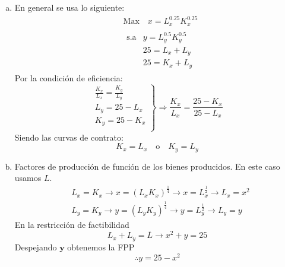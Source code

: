 \begin{enumerate}[a)]
	\item En general se usa lo siguiente:
			\begin{align*}
				& \text{Max} \quad x = L_{x}^{0.25}K_{x}^{0.25}\\
				& \begin{array}{ll}
					\text{s.a} & y = L_{y}^{0.5}K_{y}^{0.5}\\[0.2cm]
							   & 25 = L_x + L_y\\[0.2cm]
							   & 25 = K_x + L_y
				  \end{array}
			\end{align*}
		  Por la condición de eficiencia:
		  	$$
		  	\left. 
			  	\begin{array}{c}
					\frac{K_x}{L_x} = \frac{K_y}{L_y}\\
					L_y = 25 - L_x\\
					K_y = 25 - K_x\\
			  	\end{array} 
	  		\right\rbrace \Longrightarrow \frac{K_x}{L_x} = \frac{25 - K_x}{25 - L_x}
		  	$$
		   Siendo las curvas de contrato:
		   	$$K_x = L_x \quad \text{o} \quad K_y = L_y$$
		   	
		   	\begin{center}
		   	\end{center}
	\item Factores de producción de función de los bienes producidos. En este caso usamos $L$.
			\begin{align*}
				& L_x = K_x \rightarrow x = \left( L_x K_x\right)^{\frac{1}{4}} \rightarrow x = L_x^{\frac{1}{2}} \rightarrow L_x= x^2\\
				& L_y = K_y \rightarrow y = \left( L_y K_y\right)^{\frac{1}{4}} \rightarrow y = L_y^{\frac{1}{2}} \rightarrow L_y= y
			\end{align*}
		  En la restricción de factibilidad
		  	$$L_x + L_y = \overline{L} \rightarrow x^2+y=25 $$
		  Despejando $\textbf{y}$ obtenemos la FPP
		  	$$\therefore y = 25 - x^2$$
		  	\begin{center}
\end{center}
\end{enumerate}
